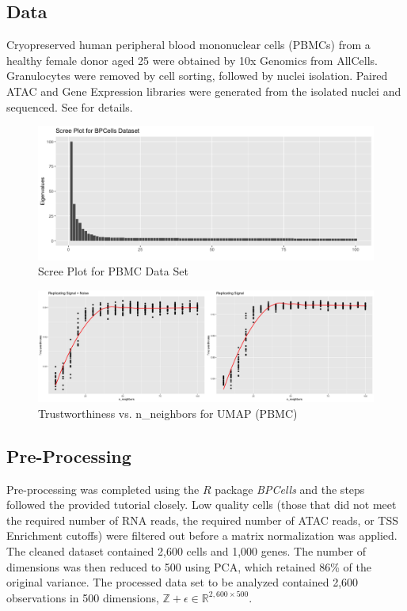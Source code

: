 \documentclass{article}
\begin{document}
\subsection{Data}
Cryopreserved human peripheral blood mononuclear cells (PBMCs) from a healthy female donor aged 25 were obtained by 10x Genomics from AllCells. Granulocytes were removed by cell sorting, followed by nuclei isolation. Paired ATAC and Gene Expression libraries were generated from the isolated nuclei and sequenced. See \cite{BPCells data} for details.

\renewcommand{\thefigure}{14}
\begin{figure}[t]
\includegraphics[scale=0.43]{BPCells_scree}
\centering
\caption{Scree Plot for PBMC Data Set}
\end{figure}

\renewcommand{\thefigure}{15}
\begin{figure}[t]
\includegraphics[scale=0.22]{trust_plot_BPCells}
\centering
\caption{Trustworthiness vs. n\_neighbors for UMAP (PBMC)}
\end{figure}

\subsection{Pre-Processing}
Pre-processing was completed using the $R$ package \textit{BPCells} and the steps followed the provided tutorial \cite{BPCells tutorial} closely. Low quality cells (those that did not meet the required number of RNA reads, the required number of ATAC reads, or TSS Enrichment cutoffs) were filtered out before a matrix normalization was applied. The cleaned dataset contained 2,600 cells and 1,000 genes. The number of dimensions was then reduced to 500 using PCA, which retained 86\% of the original variance. The processed data set to be analyzed contained 2,600 observations in 500 dimensions, $\mathbb{Z + \epsilon} \in \mathbb{R}^{2,600 \times 500}$.
\end{document}
